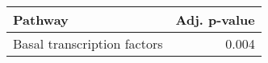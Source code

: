 \begin{tabular}{lr}
\toprule
                     Pathway &  Adj. p-value \\
\midrule
 Basal transcription factors &         0.004 \\
\bottomrule
\end{tabular}
